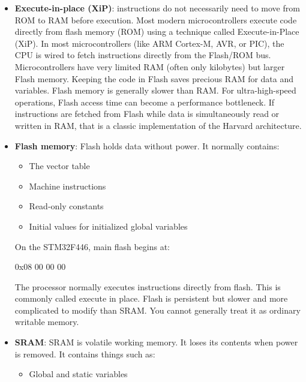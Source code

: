 \documentclass{report}
\begin{document}
\begin{itemize}
        \item \textbf{Execute-in-place (XiP)}:  instructions do not necessarily need to move from ROM to RAM before execution. Most modern microcontrollers execute code directly from flash memory (ROM) using a technique called Execute-in-Place (XiP).
            \bigbreak \noindent 
            In most microcontrollers (like ARM Cortex-M, AVR, or PIC), the CPU is wired to fetch instructions directly from the Flash/ROM bus.
            \bigbreak \noindent 
            Microcontrollers have very limited RAM (often only kilobytes) but larger Flash memory. Keeping the code in Flash saves precious RAM for data and variables.
            \bigbreak \noindent 
            Flash memory is generally slower than RAM. For ultra-high-speed operations, Flash access time can become a performance bottleneck.
            \bigbreak \noindent 
            If instructions are fetched from Flash while data is simultaneously read or written in RAM, that is a classic implementation of the Harvard architecture.
        \item \textbf{Flash memory}: Flash holds data without power. It normally contains:
            \begin{itemize}
                \item The vector table
                \item Machine instructions
                \item Read-only constants
                \item Initial values for initialized global variables
            \end{itemize}
            On the STM32F446, main flash begins at:
            \bigbreak \noindent 
            \begin{ccode}
            0x08 00 00 00
            \end{ccode}
            \bigbreak \noindent 
            The processor normally executes instructions directly from flash. This is commonly called execute in place.
            \bigbreak \noindent 
            Flash is persistent but slower and more complicated to modify than SRAM. You cannot generally treat it as ordinary writable memory.
        \item \textbf{SRAM}: SRAM is volatile working memory. It loses its contents when power is removed.
            \bigbreak \noindent 
            It contains things such as:
            \begin{itemize}
                \item Global and static variables

\end{itemize}
\end{itemize}
\end{document}
